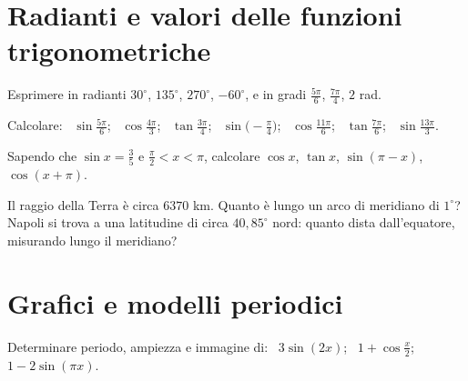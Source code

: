 \section{Radianti e valori delle funzioni trigonometriche}

\begin{esercizio}[\liv{1}]
Esprimere in radianti $30^\circ$, $135^\circ$, $270^\circ$, $-60^\circ$, e in gradi $\frac{5\pi}6$, $\frac{7\pi}4$, $2$ rad.
\end{esercizio}

\begin{esercizio}[\liv{1}]
Calcolare: \ $\sin\frac{5\pi}6$; \ $\cos\frac{4\pi}3$; \ $\tan\frac{3\pi}4$; \ $\sin\bigl(-\frac\pi4\bigr)$; \ $\cos\frac{11\pi}6$; \ $\tan\frac{7\pi}6$; \ $\sin\frac{13\pi}3$.
\end{esercizio}

\begin{esercizio}[\liv{2}]
Sapendo che $\sin x=\frac35$ e $\frac\pi2<x<\pi$, calcolare $\cos x$, $\tan x$, $\sin(\pi-x)$, $\cos(x+\pi)$.
\end{esercizio}

\begin{esercizio}[\liv{2}]
Il raggio della Terra è circa $6370$ km. Quanto è lungo un arco di meridiano di $1^\circ$? Napoli si trova a una latitudine di circa $40{,}85^\circ$ nord: quanto dista dall'equatore, misurando lungo il meridiano?
\end{esercizio}

\section{Grafici e modelli periodici}

\begin{esercizio}[\liv{1}]
Determinare periodo, ampiezza e immagine di: \ $3\sin(2x)$; \ $1+\cos\frac x2$; \ $1-2\sin(\pi x)$.
\end{esercizio}

